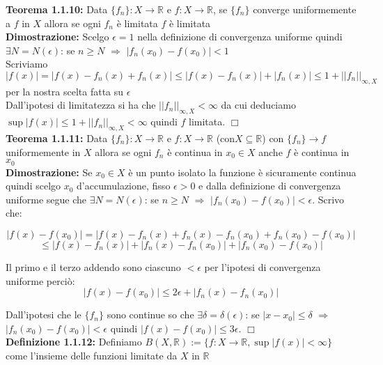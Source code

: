 \documentclass[a4paper,11pt,titlepage]{book}
\begin{document}
\textbf{Teorema 1.1.10:} Data $\{f_{n}\}:X\rightarrow\mathbb{R}$ e $f:X\rightarrow\mathbb{R}$, se $\{f_{n}\}$ converge uniformemente a $f$ in $X$ allora se ogni $f_{n}$ è limitata $f$ è limitata\\

\textbf{Dimostrazione:} Scelgo $\epsilon =1$ nella definizione di convergenza uniforme  quindi $\exists{N}=N(\epsilon)$: se $n\geq{N}$ $\Rightarrow$ $|f_{n}(x_{0})-f(x_{0})|<1$\\

Scriviamo $|f(x)|=|f(x)-f_{n}(x)+f_{n}(x)|\leq |f(x)-f_{n}(x)|+|f_{n}(x)|\leq 1+||f_{n}||_{\infty,X}$ per la nostra scelta fatta su $\epsilon$\\

Dall'ipotesi di limitatezza si ha che $||f_{n}||_{\infty,X}<\infty$ da cui deduciamo $\sup |f(x)|\leq 1+||f_{n}||_{\infty,X}<\infty$ quindi $f$ limitata. $\Box$ \\

\textbf{Teorema 1.1.11:} Data $\{f_{n}\}:X\rightarrow\mathbb{R}$ e $f:X\rightarrow\mathbb{R}$ (con$X\subseteq \mathbb{R}$) con $\{f_{n}\}\rightarrow f$ uniformemente in $X$ allora se ogni $f_{n}$ è continua in $x_0 \in X$ anche $f$ è continua in $x_0$\\

\textbf{Dimostrazione:} Se $x_0 \in X$ è un punto isolato la funzione è sicuramente continua quindi scelgo $x_0$ d'accumulazione, fisso $\epsilon >0$ e dalla definizione di convergenza uniforme segue che $\exists{N}=N(\epsilon)$: se $n\geq{N}$ $\Rightarrow$ $|f_{n}(x_{0})-f(x_{0})|<\epsilon$. Scrivo che:


$$|f(x)-f(x_0)|=|f(x)-f_{n}(x)+f_{n}(x)-f_{n}(x_{0})+f_{n}(x_{0})-f(x_0)|$$ $$\leq
|f(x)-f_{n}(x)|+|f_{n}(x)-f_{n}(x_{0})|+|f_{n}(x_{0})-f(x_0)|$$

 Il primo e il terzo addendo sono ciascuno $<\epsilon$ per l'ipotesi di convergenza uniforme perciò: 
 $$|f(x)-f(x_0)|\leq 2\epsilon+|f_{n}(x)-f_{n}(x_{0})|$$
 
Dall'ipotesi che le $\{f_{n}\}$ sono continue so che $\exists{\delta}=\delta(\epsilon)$: se $|x-x_0|\leq{\delta}$ $\Rightarrow$ $|f_{n}(x_{0})-f(x_{0})|<\epsilon$ quindi $|f(x)-f(x_0)|\leq 3\epsilon$. $\Box$ \\

\textbf{Definizione 1.1.12:} Definiamo $B(X,\mathbb{R}):=\{f:X\rightarrow\mathbb{R},\sup |f(x)|<\infty\}$ come l'insieme delle funzioni limitate da $X$ in $\mathbb{R}$ \\
\end{document}
